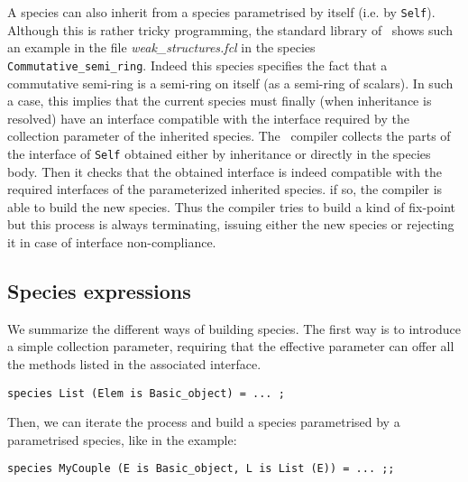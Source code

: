 A species can also inherit from a species parametrised by itself
(i.e. by {\tt Self}). Although this is rather tricky programming, the
standard library of \focal\ shows such an example in the file {\em
  weak\_structures.fcl} in the species {\tt
  Commutative\_semi\_ring}. Indeed this species specifies the fact
that a commutative semi-ring is a semi-ring on itself (as a semi-ring
of scalars).  In such a case, this implies that the current species
must finally (when inheritance is resolved) have an interface
compatible with the interface required by the collection parameter of
the inherited species. The \focal\ compiler collects the parts of the
interface of {\tt Self} obtained either by inheritance or directly in
the species body. Then it checks that the obtained interface is indeed
compatible with the required interfaces of the parameterized inherited
species. if so, the compiler is able to build the new species. Thus
the compiler tries to build a kind of fix-point but  this process is
always terminating, issuing either the new species or rejecting it in
case of interface non-compliance. 




\subsection{Species expressions}
We summarize the different ways of building species. The first way is
to introduce a simple collection parameter, requiring that the
effective parameter can offer all the methods listed in the associated
interface. 

{\scriptsize
\begin{lstlisting}
species List (Elem is Basic_object) = ... ;
\end{lstlisting}
}

Then, we can iterate the process and build 
a species parametrised by a parametrised species, like in the example:
{\scriptsize
\begin{lstlisting}
species MyCouple (E is Basic_object, L is List (E)) = ... ;;
\end{lstlisting}
}

